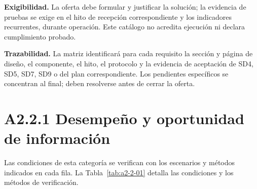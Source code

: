 \textbf{Exigibilidad.} La oferta debe formular y justificar la solución;
la evidencia de pruebas se exige en el hito de recepción correspondiente y
los indicadores recurrentes, durante operación. Este catálogo no acredita
ejecución ni declara cumplimiento probado.

\textbf{Trazabilidad.} La matriz identificará para cada requisito la sección y
página de diseño, el componente, el hito, el protocolo y la evidencia de
aceptación de SD4, SD5, SD7, SD9 o del plan correspondiente. Los pendientes
específicos se concentran al final; deben resolverse antes de cerrar la oferta.
\clearpage\section*{A2.2.1 Desempeño y oportunidad de información}
Las condiciones de esta categoría se verifican con los escenarios y métodos indicados en cada fila.
La Tabla~\ref{tab:a2-2-01} detalla las condiciones y los métodos de verificación.
\setlength{\AnchoTablaAnexo}{\dimexpr\linewidth-12\tabcolsep-7\arrayrulewidth\relax}
